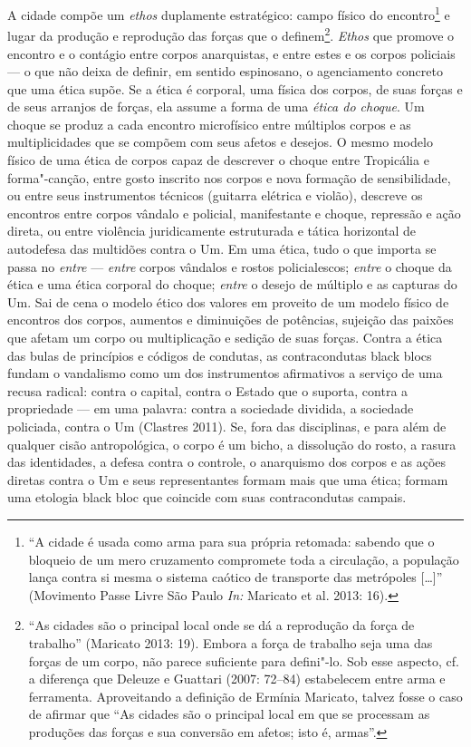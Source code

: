 A cidade compõe um \emph{ethos }duplamente estratégico: campo
físico do encontro\footnote{``A cidade é usada como
  arma para sua própria retomada: sabendo que o bloqueio de um mero
  cruzamento compromete toda a circulação, a população lança contra si
  mesma o sistema caótico de transporte das metrópoles {[}\ldots{}{]}''
  (Movimento Passe Livre São Paulo \emph{In: }Maricato et al. 2013:
  16).} e lugar da produção e reprodução das forças que o
definem\footnote{``As cidades são o principal local
  onde se dá a reprodução da força de trabalho'' (Maricato 2013: 19).
  Embora a força de trabalho seja uma das forças de um corpo, não parece
  suficiente para defini"-lo. Sob esse aspecto, cf. a diferença que
  Deleuze e Guattari (2007: 72--84) estabelecem entre arma e ferramenta.
  Aproveitando a definição de Ermínia Maricato, talvez fosse o caso de
  afirmar que ``As cidades são o principal local em que se processam as
  produções das forças e sua conversão em afetos; isto é, armas''.}.
\emph{Ethos} que promove o encontro e o contágio entre corpos
anarquistas, e entre estes e os corpos policiais --- o que não deixa de
definir, em sentido espinosano, o agenciamento concreto que uma ética
supõe. Se a ética é corporal, uma física dos corpos, de suas forças e de
seus arranjos de forças, ela assume a forma de uma \emph{ética do
choque}. Um choque se produz a cada encontro microfísico entre múltiplos
corpos e as multiplicidades que se compõem com seus afetos e desejos. O
mesmo modelo físico de uma ética de corpos capaz de descrever o choque
entre Tropicália e forma"-canção, entre gosto inscrito nos corpos e nova
formação de sensibilidade, ou entre seus instrumentos técnicos (guitarra
elétrica e violão), descreve os encontros entre corpos vândalo e
policial, manifestante e choque, repressão e ação direta, ou entre
violência juridicamente estruturada e tática horizontal de autodefesa
das multidões contra o Um. Em uma ética, tudo o que importa se passa no
\emph{entre} --- \emph{entre} corpos vândalos e rostos policialescos;
\emph{entre }o choque da ética e uma ética corporal do choque;
\emph{entre} o desejo de múltiplo e as capturas do Um. Sai de cena o
modelo ético dos valores em proveito de um modelo físico de encontros
dos corpos, aumentos e diminuições de potências, sujeição das paixões
que afetam um corpo ou multiplicação e sedição de suas forças. Contra a
ética das bulas de princípios e códigos de condutas, as contracondutas
black blocs fundam o vandalismo como um dos instrumentos afirmativos a
serviço de uma recusa radical: contra o capital, contra o Estado que o
suporta, contra a propriedade --- em uma palavra: contra a sociedade
dividida, a sociedade policiada, contra o Um (Clastres 2011). Se, fora
das disciplinas, e para além de qualquer cisão antropológica, o corpo é
um bicho, a dissolução do rosto, a rasura das identidades, a defesa
contra o controle, o anarquismo dos corpos e as ações diretas contra o
Um e seus representantes formam mais que uma ética; formam uma etologia
black bloc que coincide com suas contracondutas campais.

